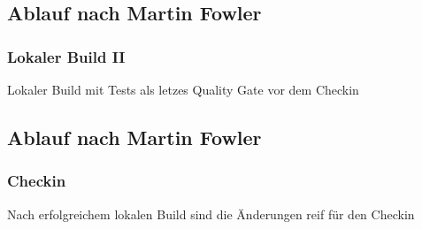 \documentclass[hyperref={pdfpagelabels=false}]{beamer}
\begin{document}
\subsection{Ablauf nach Martin Fowler}
\begin{frame} [t]
\frametitle{Lokaler Build II}
\begin{figure}[h]
  \centering
\end{figure}
\vspace{0.5cm} 
Lokaler Build mit Tests als letzes Quality Gate vor dem Checkin
\end{frame}

\subsection{Ablauf nach Martin Fowler}
\begin{frame} [t]
\frametitle{Checkin}
\begin{figure}[h]
  \centering
\end{figure}
\vspace{0.5cm} 
Nach erfolgreichem lokalen Build sind die Änderungen reif für den Checkin
\end{frame}
\end{document}
